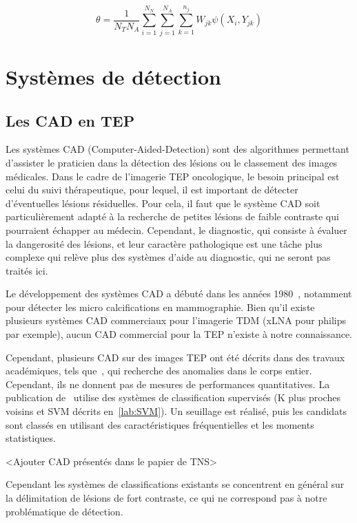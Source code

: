 \begin{equation}
\label{eq:JAFROC2}
\theta=\frac{1}{N_T N_A} \sum_{i=1}^{N_N} \sum_{j=1}^{N_A} \sum_{k=1}^{n_j} W_{jk} \psi(X_i, Y_{jk})
\end{equation}


\chapter{Systèmes de détection}

	\section{Les CAD en TEP}

Les systèmes CAD (Computer-Aided-Detection) sont des algorithmes permettant d'assister le praticien dans la détection des lésions ou le classement des images médicales. Dans le cadre de l'imagerie TEP oncologique, le besoin principal est celui du suivi thérapeutique, pour lequel, il est important de détecter d'éventuelles lésions résiduelles. Pour cela, il faut que le système CAD soit particulièrement adapté à la recherche de petites lésions de faible contraste qui pourraient échapper au médecin. Cependant, le diagnostic, qui consiste à évaluer la dangerosité des lésions, et leur caractère pathologique est une tâche plus complexe qui relève plus des systèmes d'aide au diagnostic, qui ne seront pas traités ici.

Le développement des systèmes CAD a débuté dans les années 1980~\cite{chan1987image}, notamment pour détecter les micro calcifications en mammographie. Bien qu'il existe plusieurs systèmes CAD commerciaux pour l'imagerie TDM (xLNA pour philips par exemple), aucun CAD commercial pour la TEP n'existe à notre connaissance.

Cependant, plusieurs CAD sur des images TEP ont été décrits dans des travaux académiques, tels que~\cite{guan2006automatic}, qui recherche des anomalies dans le corps entier. Cependant, ils ne donnent pas de mesures de performances quantitatives. La publication de~\cite{Kanakatte2008pulmonary} utilise des systèmes de classification supervisés (K plus proches voisins et SVM décrits en~\ref{lab:SVM}). Un seuillage est réalisé, puis les candidats sont classés en utilisant des caractéristiques fréquentielles et les moments statistiques. 

<Ajouter CAD présentés dans le papier de TNS>

Cependant les systèmes de classifications existants se concentrent en général sur la délimitation de lésions de fort contraste, ce qui ne correspond pas à notre problématique de détection. 

